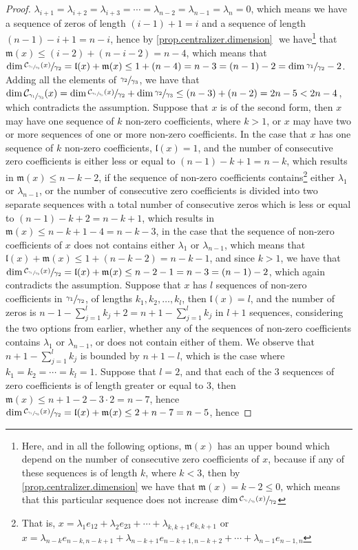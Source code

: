 \documentclass[12pt]{article}
\begin{document}
\begin{proof}
$\lambda_{i+1}=\lambda_{i+2}=\lambda_{i+3}=\cdots=\lambda_{n-2}=\lambda_{n-1}=\lambda_n=0$, which means we have a sequence of zeros of length $(i-1)+1=i$ and a sequence of length $(n-1)-i+1=n-i$, hence by \ref{prop.centralizer.dimension} $\mathfrak{}$ we have\footnote{Here, and in all the following options, $\mathfrak{m}(x)$ has an upper bound which depend on the number of consecutive zero coefficients of $x$, because if any of these sequences is of length $k$, where $k<3$, then by \ref{prop.centralizer.dimension} we have that $\mathfrak{m}(x)=k-2\leq 0$, which means that this particular sequence does not increase $\dim\sfrac{\mathcal{C}_{\sfrac{\gamma_1}{\gamma_3}}(x)}{\gamma_2}$} that $\mathfrak{m}(x)\leq(i-2)+(n-i-2)=n-4$, which means that $\dim\sfrac{\mathcal{C}_{\sfrac{\gamma_1}{\gamma_3}}(x)}{\gamma_2}=\mathfrak{l}(x)+\mathfrak{m}(x)\leq 1+(n-4)=n-3=(n-1)-2=\dim\sfrac{\gamma_1}{\gamma_2}-2$. Adding all the elements of $\sfrac{\gamma_2}{\gamma_3}$, we have that $\dim\mathcal{C}_{\sfrac{\gamma_1}{\gamma_3}}(x)=\dim\sfrac{\mathcal{C}_{\sfrac{\gamma_1}{\gamma_3}}(x)}{\gamma_2}+\dim\sfrac{\gamma_2}{\gamma_3}\leq(n-3)+(n-2)=2n-5<2n-4$, which contradicts the assumption. Suppose that $x$ is of the second form, then $x$ may have one sequence of $k$ non-zero coefficients, where $k>1$, or $x$ may have two or more sequences of one or more non-zero coefficients. In the case that $x$ has one sequence of $k$ non-zero coefficients, $\mathfrak{l}(x)=1$, and the number of consecutive zero coefficients is either less or equal to $(n-1)-k+1=n-k$, which results in $\mathfrak{m}(x)\leq n-k-2$, if the sequence of non-zero coefficients contains\footnote{That is, $x=\lambda_1 e_{12}+\lambda_2 e_{23}+\cdots+\lambda_{k,k+1}e_{k,k+1}$ or $x=\lambda_{n-k}e_{n-k,n-k+1}+\lambda_{n-k+1}e_{n-k+1,n-k+2}+\cdots+\lambda_{n-1}e_{n-1,n}$} either $\lambda_1$ or $\lambda_{n-1}$, or the number of consecutive zero coefficients is divided into two separate sequences with a total number of consecutive zeros which is less or equal to $(n-1)-k+2=n-k+1$, which results in $\mathfrak{m}(x)\leq n-k+1-4=n-k-3$, in the case that the sequence of non-zero coefficients of $x$ does not contains either $\lambda_1$ or $\lambda_{n-1}$, which means that $\mathfrak{l}(x)+\mathfrak{m}(x)\leq 1+(n-k-2)=n-k-1$, and since $k>1$, we have that $\dim\sfrac{\mathcal{C}_{\sfrac{\gamma_1}{\gamma_3}}(x)}{\gamma_2}=\mathfrak{l}(x)+\mathfrak{m}(x)\leq n-2-1=n-3=(n-1)-2$, which again contradicts the assumption. Suppose that $x$ has $l$ sequences of non-zero coefficients in $\sfrac{\gamma_1}{\gamma_2}$, of lengths $k_1,k_2,\dots,k_l$, then $\mathfrak{l}(x)=l$, and the number of zeros is $n-1-\sum_{j=1}^l k_j+2=n+1-\sum_{j=1}^l k_j$ in $l+1$ sequences, considering the two options from earlier, whether any of the sequences of non-zero coefficients contains $\lambda_1$ or $\lambda_{n-1}$, or does not contain either of them. We observe that $n+1-\sum_{j=1}^l k_j$ is bounded by $n+1-l$, which is the case where $k_1=k_2=\cdots=k_l=1$. Suppose that $l=2$, and that each of the $3$ sequences of zero coefficients is of length greater or equal to $3$, then $\mathfrak{m}(x)\leq n+1-2-3\cdot 2=n-7$, hence $\dim\sfrac{\mathcal{C}_{\sfrac{\gamma_1}{\gamma_3}}(x)}{\gamma_2}=\mathfrak{l}(x)+\mathfrak{m}(x)\leq 2+n-7=n-5$, hence 
\end{proof}
\end{document}
